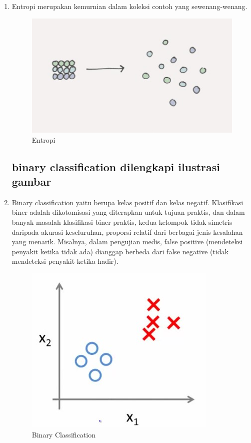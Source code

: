 \begin{enumerate}
\item Entropi merupakan kemurnian dalam koleksi contoh yang sewenang-wenang.

\begin{figure}[ht]
\centering
\includegraphics[scale=0.5]{figures/f8.jpg}
\caption{Entropi}
\label{contoh}
\end{figure}

\subsection{binary classification dilengkapi ilustrasi gambar}

\item Binary classification yaitu berupa kelas positif dan kelas negatif. Klasifikasi biner adalah dikotomisasi yang diterapkan untuk tujuan praktis, dan dalam banyak masalah klasifikasi biner praktis, kedua kelompok tidak simetris - daripada akurasi keseluruhan, proporsi relatif dari berbagai jenis kesalahan yang menarik. Misalnya, dalam pengujian medis, false positive (mendeteksi penyakit ketika tidak ada) dianggap berbeda dari false negative (tidak mendeteksi penyakit ketika hadir).

\begin{figure}[ht]
\centering
\includegraphics[scale=0.5]{figures/f1.jpg}
\caption{Binary Classification}
\label{contoh}
\end{figure}


\end{enumerate}

